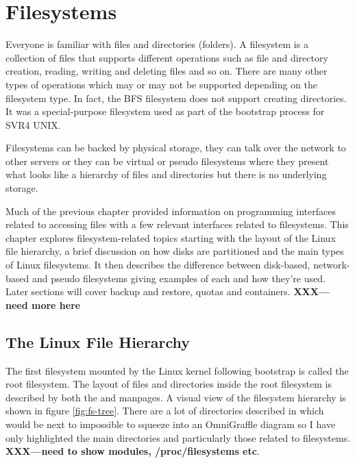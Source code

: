\chapter{Filesystems}

Everyone is familiar with files and directories (folders). A filesystem is a collection of files that supports different operations such as file and directory creation, reading, writing and deleting files and so on. There are many other types of operations which may or may not be supported depending on the filesystem type. In fact, the BFS filesystem does not support creating directories. It was a special-purpose filesystem used as part of the bootstrap process for SVR4 UNIX.

Filesystems can be backed by physical storage, they can talk over the network to other servers or they can be virtual or pseudo filesystems where they present what looks like a hierarchy of files and directories but there is no underlying storage.

Much of the previous chapter provided information on programming interfaces related to accessing files with a few relevant interfaces related to filesystems. This chapter explores filesystem-related topics starting with the layout of the Linux file hierarchy, a brief discussion on how disks are partitioned and the main types of Linux filesystems. It then describes the difference between disk-based, network-based and pseudo filesystems giving examples of each and how they're used. Later sections will cover backup and restore, quotas and containers. \textbf{XXX---need more here}



\section{The Linux File Hierarchy}

The first filesystem mounted by the Linux kernel following bootstrap is called the root filesystem. The layout of files and directories inside the root filesystem is described by both the  and  manpages. A visual view of the filesystem hierarchy is shown in figure \ref{fig:fs-tree}. There are a lot of directories described in  which would be next to impossible to squeeze into an OmniGraffle diagram so I have only highlighted the main directories and particularly those related to filesystems. \textbf{XXX---need to show modules, /proc/filesystems etc}.

